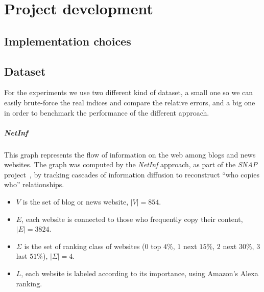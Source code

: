 
\chapter{Project development}
    
    \section{Implementation choices}
    
    
    
    \section{Dataset}
    
    For the experiments we use two different kind of dataset, a small one so we can easily brute-force the real indices and compare the relative errors, and a big one in order to benchmark the performance of the different approach.
    
    \paragraph*{NetInf} This graph represents the flow of information on the web among blogs and news websites. The graph was computed by the \textit{NetInf} approach, as part of the \textit{SNAP} project~\cite{netinf}, by tracking cascades of information diffusion to reconstruct ``who copies who'' relationships.
    
    \begin{itemize}
    	\item $V$ is the set of blog or news website, $|V| = 854$.
    	\item $E$, each website is connected to those who frequently copy their content, $|E| = 3824$.
    	\item $\Sigma$ is the set of ranking class of websites ($0$ top $4\%$, $1$ next $15\%$, $2$ next $30\%$, $3$ last $51\%$), $|\Sigma| = 4$.
    	\item $L$, each website is labeled according to its importance, using Amazon's Alexa ranking.
    \end{itemize}

    
